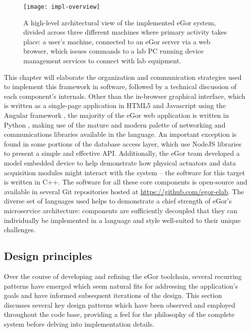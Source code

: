 \documentclass[../thesis]{subfiles}
\begin{document}
\begin{figure}
  \texttt{[image: impl-overview]}
  \caption{
    A high-level architectural view of the implemented eGor system,
    divided across three different machines where primary activity
    takes place: a user's machine, connected to an eGor server via a
    web browser, which issues commands to a lab PC running device
    management services to connect with lab equipment.
    \label{fig:ImplOverview}
  }
\end{figure}

This chapter will elaborate the organization and communication
strategies used to implement this framework in software, followed by a
technical discussion of each component's internals.  Other than the
in-browser graphical interface, which is written as a single-page
application in HTML5 and Javascript using the Angular framework
\cite{Angular}, the majority of the eGor web application is written in
Python \cite{Python}, making use of the mature and modern palette of
networking and communications libraries available in the language. An
important exception is found in some portions of the database access
layer, which use NodeJS \cite{NodeJS} libraries to present a simple
and effective API. Additionally, the eGor team developed a model
embedded device to help demonstrate how physical actuators and data
acquisition modules might interact with the system -- the software for
this target is written in C++. The software for all these core
components is open-source and available in several Git repositories
hosted at \url{https://github.com/egor-elab}. The diverse set of
languages used helps to demonstrate a chief strength of eGor's
microservice architecture: components are sufficiently decoupled that
they can individually be implemented in a language and style
well-suited to their unique challenges.

\subsection{Design principles}
Over the course of developing and refining the eGor toolchain, several
recurring patterns have emerged which seem natural fits for addressing
the application's goals and have informed subsequent iterations of the
design. This section discusses several key design patterns which have
been observed and employed throughout the code base, providing a feel
for the philosophy of the complete system before delving into
implementation details.
\end{document}
